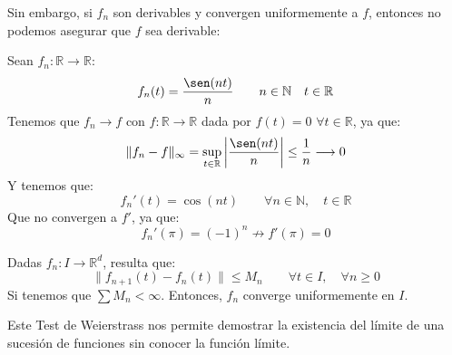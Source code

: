Sin embargo, si $f_n$ son derivables y convergen uniformemente a $f$, entonces no podemos asegurar que $f$ sea derivable:
\begin{ejemplo}
    Sean $f_n:\mathbb{R}\rightarrow\mathbb{R}$:
    \begin{equation*}
        f_n(t) = \dfrac{\sen(nt)}{n} \qquad n\in \mathbb{N} \quad t\in \mathbb{R}
    \end{equation*}
    Tenemos que $f_n\rightarrow f$ con $f:\mathbb{R}\rightarrow\mathbb{R}$ dada por $f(t) = 0$ $\forall t\in \mathbb{R}$, ya que:
    \begin{equation*}
        \|f_n - f\|_\infty = \sup_{t\in \mathbb{R}} \left|\dfrac{\sen(nt)}{n}\right| \leq \dfrac{1}{n} \longrightarrow 0
    \end{equation*}
    Y tenemos que:
    \begin{equation*}
        f_n'(t) = \cos(nt) \qquad \forall n\in \mathbb{N}, \quad t\in \mathbb{R}
    \end{equation*}
    Que no convergen a $f'$, ya que:
    \begin{equation*}
        f_n'(\pi) = {(-1)}^{n} \not\rightarrow f'(\pi) = 0
    \end{equation*}
\end{ejemplo}

\begin{prop}
    Dadas $f_n:I\rightarrow\mathbb{R}^d$, resulta que:
    \begin{equation*}
        \|f_{n+1}(t) - f_n(t)\| \leq M_n \qquad \forall t\in I, \quad \forall n\geq 0
    \end{equation*}
    Si tenemos que $\sum M_n < \infty$. Entonces, $f_n$ converge uniformemente en $I$.
\end{prop}
Este Test de Weierstrass nos permite demostrar la existencia del límite de una sucesión de funciones sin conocer la función límite.

